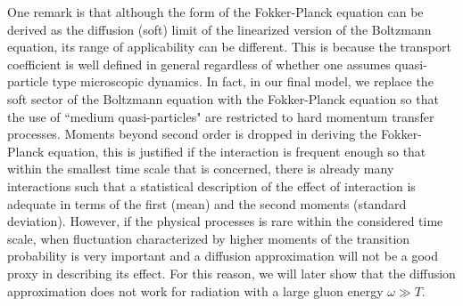 One remark is that although the form of the Fokker-Planck equation can be derived as the diffusion (soft) limit of the linearized version of the Boltzmann equation, its range of applicability can be different.
This is because the transport coefficient is well defined in general regardless of whether one assumes quasi-particle type microscopic dynamics.
In fact, in our final model, we replace the soft sector of the Boltzmann equation with the Fokker-Planck equation so that the use of ``medium quasi-particles" are restricted to hard momentum transfer processes.
Moments beyond second order is dropped in deriving the Fokker-Planck equation, this is justified if the interaction is frequent enough so that within the smallest time scale that is concerned, there is already many interactions such that a statistical description of the effect of interaction is adequate in terms of the first (mean) and the second moments (standard deviation).
However, if the physical processes is rare within the considered time scale, when fluctuation characterized by higher moments of the transition probability is very important and a diffusion approximation will not be a good proxy in describing its effect.
For this reason, we will later show that the diffusion approximation  does not work for radiation with a large gluon energy $\omega \gg T$.

